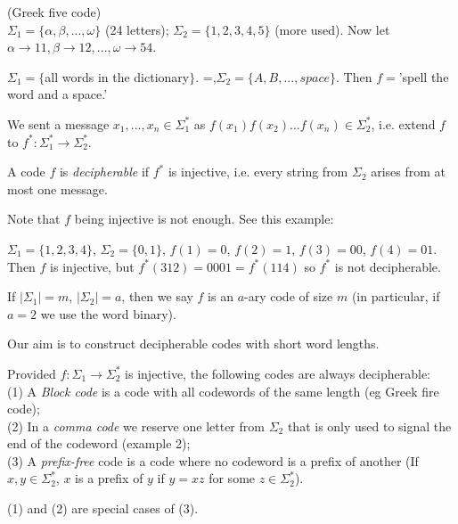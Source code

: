 \documentclass[a4paper]{article}
\begin{document}
\begin{eg} (Greek five code)\\
$\Sigma_1 = \{\alpha,\beta,...,\omega\}$ (24 letters); $\Sigma_2 = \{1,2,3,4,5\}$ (more used). Now let $\alpha \to 11, \beta \to 12, ...,\omega \to 54$.
\end{eg}

\begin{eg}
$\Sigma_1 = \{$all words in the dictionary$\}$. =,$\Sigma_2 = \{A,B,...,space\}$. Then $f=$'spell the word and a space.'
\end{eg}

We sent a message $x_1,...,x_n \in \Sigma^*_1$ as $f(x_1)f(x_2)...f(x_n) \in \Sigma_2^*$, i.e. extend $f$ to $f^* : \Sigma_1^* \to \Sigma_2^*$.

\begin{defi}
A code $f$ is \emph{decipherable} if $f^*$ is injective, i.e. every string from $\Sigma_2$ arises from at most one message.
\end{defi}

Note that $f$ being injective is not enough. See this example:

\begin{eg}
$\Sigma_1 = \{1,2,3,4\}$, $\Sigma_2 = \{0,1\}$, $f(1) = 0$, $f(2) = 1$, $f(3) = 00$, $f(4) = 01$. Then $f$ is injective, but $f^*(312) = 0001 = f^*(114)$ so $f^*$ is not decipherable.
\end{eg}

\begin{notation}
If $|\Sigma_1| = m$, $|\Sigma_2| = a$, then we say $f$ is an $a$-ary code of size $m$ (in particular, if $a=2$ we use the word binary).
\end{notation}

Our aim is to construct decipherable codes with short word lengths.

Provided $f:\Sigma_1 \to \Sigma^*_2$ is injective, the following codes are always decipherable:\\
(1) A \emph{Block code} is a code with all codewords of the same length (eg Greek fire code);\\
(2) In a \emph{comma code} we reserve one letter from $\Sigma_2$ that is only used to signal the end of the codeword (example 2);\\
(3) A \emph{prefix-free} code is a code where no codeword is a prefix of another (If $x,y \in \Sigma^*_2$, $x$ is a prefix of $y$ if $y=xz$ for some $z \in \Sigma^*_2$).

\begin{rem}
(1) and (2) are special cases of (3).
\end{rem}
\end{document}
